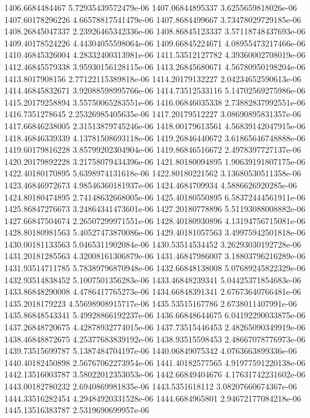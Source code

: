 {1406.6684484467 5.72935439572479e-06
1407.06844895337 3.6255659818026e-06
1407.60178296226 4.66578817541479e-06
1407.8684499667 3.73478029729185e-06
1408.26845047337 2.23926465342336e-06
1408.86845123337 3.57118748437693e-06
1409.40178524226 4.44304055598064e-06
1409.66845224671 4.08955473217466e-06
1410.46845326004 4.28332400313981e-06
1411.53512127782 4.39360002708019e-06
1412.46845579338 3.95930156128115e-06
1413.26845680671 4.56780950198204e-06
1413.8017908156 2.77122115389818e-06
1414.20179132227 2.04234652590613e-06
1414.46845832671 3.92088598995766e-06
1414.73512533116 5.14702569275986e-06
1415.20179258894 3.55750065283551e-06
1416.06846035338 2.73882837992551e-06
1416.7351278645 2.25326985405635e-06
1417.20179512227 3.08690895831357e-06
1417.66846238005 2.31513879745246e-06
1418.00179613561 4.56839142047915e-06
1418.46846339339 4.13781508693118e-06
1419.26846440672 3.61865646748888e-06
1419.60179816228 3.85799202304904e-06
1419.86846516672 2.4978397727137e-06
1420.20179892228 3.21758079434396e-06
1421.80180094895 1.90639191807175e-06
1422.40180170895 5.6398974131618e-06
1422.80180221562 3.13680530511358e-06
1423.46846972673 4.98546360181937e-06
1424.4684709934 4.5886626920285e-06
1424.80180474895 2.74148632668005e-06
1425.40180550895 6.58372444561911e-06
1425.86847276673 3.24864341473601e-06
1427.20180778896 5.51193088008882e-06
1427.66847504674 2.26507299971551e-06
1428.40180930896 4.13194756715081e-06
1428.80180981563 5.40527473870086e-06
1429.40181057563 3.49975942501818e-06
1430.00181133563 5.0465311902084e-06
1430.53514534452 3.26293030192728e-06
1431.20181285563 4.32008161306879e-06
1431.46847986007 3.18803796216289e-06
1431.93514711785 5.78389796870948e-06
1432.66848138008 5.07689245822329e-06
1432.93514838452 5.1007501356283e-06
1433.46848239341 5.04425371854683e-06
1433.86848290008 4.4786417765273e-06
1434.66848391341 2.67673640766481e-06
1435.2018179223 4.55698908915717e-06
1435.53515167786 2.6738011407991e-06
1435.86848543341 5.49928866192237e-06
1436.66848644675 6.04192290033875e-06
1437.26848720675 4.42878932774015e-06
1437.73515446453 2.48265090349919e-06
1438.46848872675 4.25377683839192e-06
1438.93515598453 2.48667078776973e-06
1439.73515699787 5.1387484704197e-06
1440.06849075342 4.0763663899336e-06
1440.40182450898 2.56767062273954e-06
1441.40182577565 4.91977591220138e-06
1442.13516003787 3.58022012353053e-06
1442.66849404676 4.17631742231602e-06
1443.00182780232 2.6940869981835e-06
1443.5351618112 3.08207660674367e-06
1444.33516282454 4.29484920331528e-06
1444.6684965801 2.94672177084218e-06
1445.13516383787 2.5319690699957e-06
}
